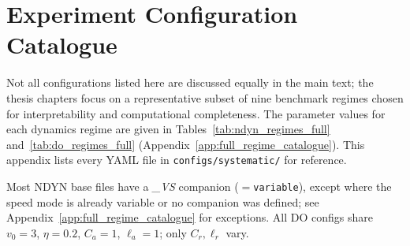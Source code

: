 \chapter{Experiment Configuration Catalogue}
\label{app:config_catalogue}

Not all configurations listed here are discussed equally in the main text;
the thesis chapters focus on a representative subset of nine benchmark
regimes chosen for interpretability and computational completeness.
The parameter values for each dynamics regime are given in
Tables~\ref{tab:ndyn_regimes_full} and~\ref{tab:do_regimes_full}
(Appendix~\ref{app:full_regime_catalogue}).  This appendix lists every
YAML file in \texttt{configs/systematic/} for reference.

\noindent\footnotesize
Most NDYN base files have a \emph{\_VS} companion (${}=$\texttt{variable}), except where the speed mode is already variable or no companion was defined; see Appendix~\ref{app:full_regime_catalogue} for exceptions.
All DO configs share $v_0{=}3$, $\eta{=}0.2$, $C_a{=}1$, $\ell_a{=}1$; only $C_r,\ell_r$ vary.

